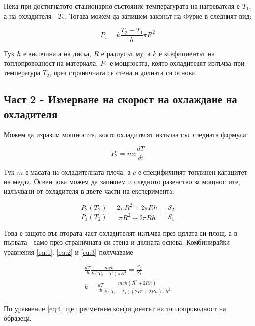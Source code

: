 \documentclass[reprint,amsmath,amssymb,aps]{revtex4-2}
\begin{document}
Нека при достигнатото стационарно състояние температурата на нагревателя е $T_1$, а на охладителя - $T_2$. Тогава можем да запишем законът на Фурие в следният вид:

\begin{equation*} \label{eq:1}
    P_1 = k\frac{T_2 - T_1}{h} \pi R^2 \tag{1}
\end{equation*}

Тук $h$ е височината на диска, $R$ е радиусът му, а $k$ е коефициентът на топлопроводност на материала. $P_1$ е мощността, която охладителят излъчва при температура $T_2$, през страничната си стена и долната си основа.

\subsection{Част 2 - Измерване на скорост на охлаждане на охладителя}

Можем да изразим мощността, която охладителят излъчва със следната формула: 

\begin{equation*} \label{eq:2}
    P_2 = m c \frac{dT}{dt} \tag{2}
\end{equation*}

Тук $m$ е масата на охладителната плоча, а $c$ е специфичният топлинен капацитет на медта. Освен това можем да запишем и следното равенство за мощностите, излъчвани от охладителя в двете части на експеримента: 

\begin{equation*} \label{eq:3}
    \frac{P_2(T_2)}{P_1(T_2)} = \frac{2\pi R^2 + 2\pi Rh}{\pi R^2 + 2\pi Rh} = \frac{S_2}{S_1} \tag{3}
\end{equation*}

Това е защото във втората част охладителят излъчва през цялата си площ, а в първата - само през страничната си стена и долната основа. Комбинирайки уравнения \eqref{eq:1}, \eqref{eq:2} и \eqref{eq:3} получаваме 

\begin{align*}
    \frac{dT}{dt} \frac{mc h}{k (T_2 - T_1) \pi R^2} = \frac{S_2}{S_1} \\
    k = \frac{dT}{dt} \frac{mc h ( R^2 + 2 Rh)}{k (T_2 - T_1) (2 R^2 + 2 Rh) \pi R^2} \label{eq:4} \tag{4}
\end{align*}

По уравнение \eqref{eq:4} ще пресметнем коефициентът на топлопроводност на образеца. 
\end{document}
